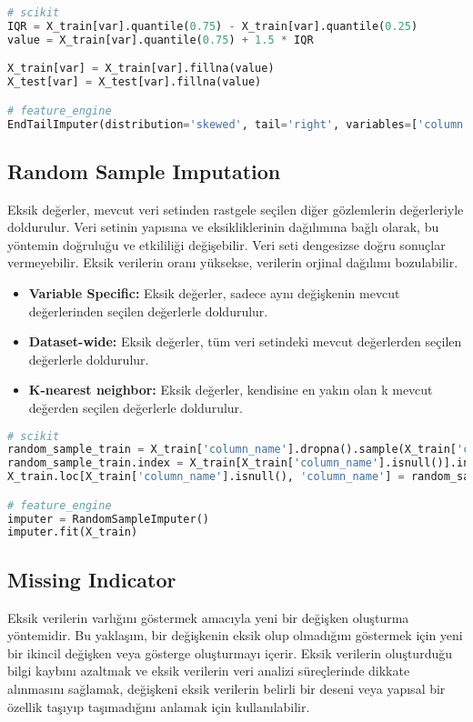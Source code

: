 \begin{lstlisting}[language=Python]
# scikit
IQR = X_train[var].quantile(0.75) - X_train[var].quantile(0.25)
value = X_train[var].quantile(0.75) + 1.5 * IQR

X_train[var] = X_train[var].fillna(value)
X_test[var] = X_test[var].fillna(value)

# feature_engine
EndTailImputer(distribution='skewed', tail='right', variables=['column'])
\end{lstlisting}

\subsection{Random Sample Imputation}
Eksik değerler, mevcut veri setinden rastgele seçilen diğer gözlemlerin değerleriyle doldurulur. Veri setinin yapısına ve eksikliklerinin dağılımına bağlı olarak, bu yöntemin doğruluğu ve etkililiği değişebilir. Veri seti dengesizse doğru sonuçlar vermeyebilir. Eksik verilerin oranı yüksekse, verilerin orjinal dağılımı bozulabilir.

\begin{itemize}
    \item \textbf{Variable Specific:} Eksik değerler, sadece aynı değişkenin mevcut değerlerinden seçilen değerlerle doldurulur.
    \item \textbf{Dataset-wide:} Eksik değerler, tüm veri setindeki mevcut değerlerden seçilen değerlerle doldurulur.
    \item \textbf{K-nearest neighbor:} Eksik değerler, kendisine en yakın olan k mevcut değerden seçilen değerlerle doldurulur.
\end{itemize}

\begin{lstlisting}[language=Python]
# scikit
random_sample_train = X_train['column_name'].dropna().sample(X_train['column_name'].isnull().sum(), random_state=0)
random_sample_train.index = X_train[X_train['column_name'].isnull()].index
X_train.loc[X_train['column_name'].isnull(), 'column_name'] = random_sample_train

# feature_engine
imputer = RandomSampleImputer()
imputer.fit(X_train)
\end{lstlisting}

\subsection{Missing Indicator}
Eksik verilerin varlığını göstermek amacıyla yeni bir değişken oluşturma yöntemidir. Bu yaklaşım, bir değişkenin eksik olup olmadığını göstermek için yeni bir ikincil değişken veya gösterge oluşturmayı içerir. Eksik verilerin oluşturduğu bilgi kaybını azaltmak ve eksik verilerin veri analizi süreçlerinde dikkate alınmasını sağlamak, değişkeni eksik verilerin belirli bir deseni veya yapısal bir özellik taşıyıp taşımadığını anlamak için kullanılabilir.

